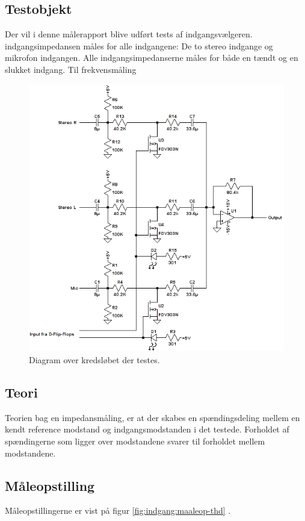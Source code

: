 \subsection*{Testobjekt}
\label{maalejournal_testobjekt}
Der vil i denne målerapport blive udført tests af indgangsvælgeren. indgangsimpedansen måles for alle indgangene: De to stereo indgange og mikrofon indgangen. Alle indgangsimpedanserne måles for både en tændt og en slukket indgang.
Til frekvensmåling 
\begin{figure}[h]
\centering
\includegraphics[scale=0.8]{maalerapporter/indgangsvaelger/indgangvaelger_ltspice_diagram.png}
\caption{Diagram over kredsløbet der testes.}
\label{diagram_simulering}
\end{figure}

\subsection*{Teori}
\label{maalejournal_teori}
Teorien bag en impedansmåling, er at der skabes en spændingsdeling mellem en kendt reference modstand og indgangsmodstanden i det testede. Forholdet af spændingerne som ligger over modstandene svarer til forholdet mellem modstandene.

\subsection*{Måleopstilling}
\label{maalejournal_maaleopstilling}
Måleopstillingerne er vist på figur \ref{fig:indgang:maaleop-thd} .

